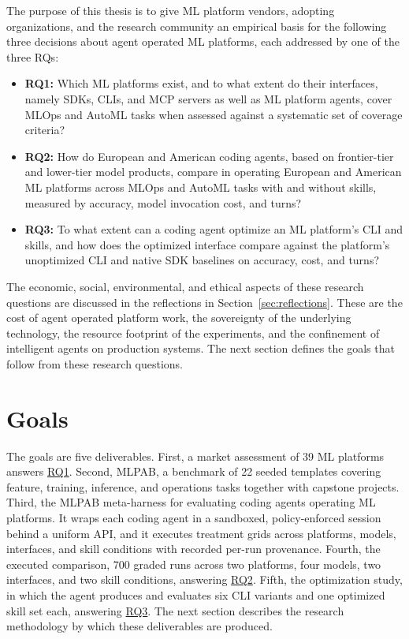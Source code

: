 \documentclass[
english,                 %
bibtex,                  %
]{kththesis}
\numberwithin{listing}{chapter}
\begin{document}
The purpose of this thesis is to give \gls{ML} platform vendors, adopting organizations, and the research community an empirical basis for the following three decisions about agent operated \gls{ML} platforms, each addressed by one of the three \glspl{RQ}:

\begin{itemize}
\item \label{rq1}\textbf{RQ1:} Which \gls{ML} platforms exist, and to what extent do their interfaces, namely \glspl{SDK}, \glspl{CLI}, and \gls{MCP} servers as well as \gls{ML} platform agents, cover \gls{MLOps} and \gls{AutoML} tasks when assessed against a systematic set of coverage criteria?
\item \label{rq2}\textbf{RQ2:} How do European and American coding agents, based on frontier-tier and lower-tier model products, compare in operating European and American \gls{ML} platforms across \gls{MLOps} and \gls{AutoML} tasks with and without skills, measured by accuracy, model invocation cost, and turns?
\item \label{rq3}\textbf{RQ3:} To what extent can a coding agent optimize an \gls{ML} platform's \gls{CLI} and skills, and how does the optimized interface compare against the platform's unoptimized \gls{CLI} and native \gls{SDK} baselines on accuracy, cost, and turns?
\end{itemize}

The economic, social, environmental, and ethical aspects of these research questions are discussed in the reflections in Section~\ref{sec:reflections}. These are the cost of agent operated platform work, the sovereignty of the underlying technology, the resource footprint of the experiments, and the confinement of intelligent agents on production systems. The next section defines the goals that follow from these research questions.

\section{Goals}
\label{sec:intro_goals}
\glsresetall

The goals are five deliverables. First, a market assessment of 39 \gls{ML} platforms answers \hyperref[rq1]{RQ1}. Second, \gls{MLPAB}, a benchmark of 22 seeded templates covering feature, training, inference, and operations tasks together with capstone projects. Third, the \gls{MLPAB} meta-harness for evaluating coding agents operating \gls{ML} platforms. It wraps each coding agent in a sandboxed, policy-enforced session behind a uniform \gls{API}, and it executes treatment grids across platforms, models, interfaces, and skill conditions with recorded per-run provenance. Fourth, the executed comparison, 700 graded runs across two platforms, four models, two interfaces, and two skill conditions, answering \hyperref[rq2]{RQ2}. Fifth, the optimization study, in which the agent produces and evaluates six \gls{CLI} variants and one optimized skill set each, answering \hyperref[rq3]{RQ3}. The next section describes the research methodology by which these deliverables are produced.
\end{document}
